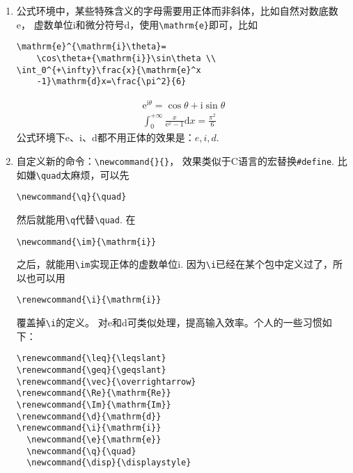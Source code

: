 \documentclass{article}
\newcommand{\q}{\quad}
\begin{document}
\begin{multicols}{2}
\begin{enumerate}
\item 公式环境中，某些特殊含义的字母需要用正体而非斜体，比如自然对数底数e，
虚数单位i和微分符号d，使用\verb|\mathrm{e}|即可，比如
\begin{lstlisting}
\mathrm{e}^{\mathrm{i}\theta}=
    \cos\theta+{\mathrm{i}}\sin\theta \\
\int_0^{+\infty}\frac{x}{\mathrm{e}^x
    -1}\mathrm{d}x=\frac{\pi^2}{6}    
\end{lstlisting} 
\begin{gather*}
    \mathrm{e}^{\mathrm{i}\theta}=
    \cos\theta+{\mathrm{i}}\sin\theta \\
    \int_0^{+\infty}\frac{x}{\mathrm{e}^x
    -1}\mathrm{d}x=\frac{\pi^2}{6} 
\end{gather*}
公式环境下e、i、d都不用正体的效果是：$ e,i,d $.

\item 自定义新的命令：\verb|\newcommand{}{}|，
效果类似于C语言的宏替换\verb|#define|. 
比如嫌\verb|\quad|太麻烦，可以先
\begin{lstlisting}
\newcommand{\q}{\quad}    
\end{lstlisting} 
然后就能用\verb|\q|代替\verb|\quad|. 
在
\begin{lstlisting}
\newcommand{\im}{\mathrm{i}}    
\end{lstlisting} 
之后，就能用\verb|\im|实现正体的虚数单位$ \mathrm{i} $.
因为\verb|\i|已经在某个包中定义过了，所以也可以用
\begin{lstlisting}
\renewcommand{\i}{\mathrm{i}}    
\end{lstlisting} 
覆盖掉\verb|\i|的定义。
对e和d可类似处理，提高输入效率。个人的一些习惯如下：
\begin{lstlisting}
\renewcommand{\leq}{\leqslant}
\renewcommand{\geq}{\geqslant} 
\renewcommand{\vec}{\overrightarrow}
\renewcommand{\Re}{\mathrm{Re}}
\renewcommand{\Im}{\mathrm{Im}}
\renewcommand{\d}{\mathrm{d}}
\renewcommand{\i}{\mathrm{i}} 
  \newcommand{\e}{\mathrm{e}}
  \newcommand{\q}{\quad}
  \newcommand{\disp}{\displaystyle}    
\end{lstlisting} 


\end{enumerate}
\end{multicols}
\end{document}
